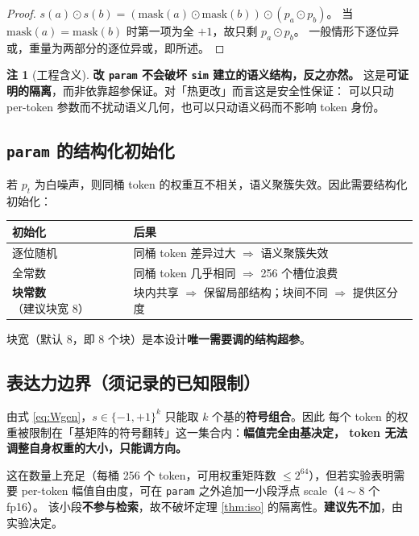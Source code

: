 \documentclass[11pt,a4paper]{ctexart}
\theoremstyle{definition}
\newtheorem{remark}{注}
\begin{document}
\begin{proof}
$s(a)\odot s(b) = (\text{mask}(a)\odot\text{mask}(b))\odot(p_a\odot p_b)$。
当 $\text{mask}(a)=\text{mask}(b)$ 时第一项为全 $+1$，故只剩 $p_a\odot p_b$。
一般情形下逐位异或，重量为两部分的逐位异或，即所述。
\end{proof}

\begin{remark}[工程含义]
\textbf{改 \texttt{param} 不会破坏 \texttt{sim} 建立的语义结构，反之亦然。}
这是\textbf{可证明的隔离}，而非依靠超参保证。对「热更改」而言这是安全性保证：
可以只动 per-token 参数而不扰动语义几何，也可以只动语义码而不影响 token 身份。
\end{remark}

\subsection{\texttt{param} 的结构化初始化}

若 $p_t$ 为白噪声，则同桶 token 的权重互不相关，语义聚簇失效。因此需要结构化初始化：

\begin{center}
\begin{tabularx}{\textwidth}{@{}lX@{}}
\toprule
\textbf{初始化} & \textbf{后果} \\
\midrule
逐位随机 & 同桶 token 差异过大 $\Rightarrow$ 语义聚簇失效 \\
全常数 & 同桶 token 几乎相同 $\Rightarrow$ 256 个槽位浪费 \\
\textbf{块常数}（建议块宽 8） & 块内共享 $\Rightarrow$ 保留局部结构；块间不同 $\Rightarrow$ 提供区分度 \\
\bottomrule
\end{tabularx}
\end{center}

块宽（默认 8，即 8 个块）是本设计\textbf{唯一需要调的结构超参}。

\subsection{表达力边界（须记录的已知限制）}

由式 \eqref{eq:Wgen}，$s\in\{-1,+1\}^k$ 只能取 $k$ 个基的\textbf{符号组合}。因此
每个 token 的权重被限制在「基矩阵的符号翻转」这一集合内：\textbf{幅值完全由基决定，
token 无法调整自身权重的大小，只能调方向。}

这在数量上充足（每桶 256 个 token，可用权重矩阵数 $\le 2^{64}$），但若实验表明需要
per-token 幅值自由度，可在 \texttt{param} 之外追加一小段浮点 scale（$4\sim 8$ 个 fp16）。
该小段\textbf{不参与检索}，故不破坏定理 \ref{thm:iso} 的隔离性。\textbf{建议先不加}，由实验决定。
\end{document}
